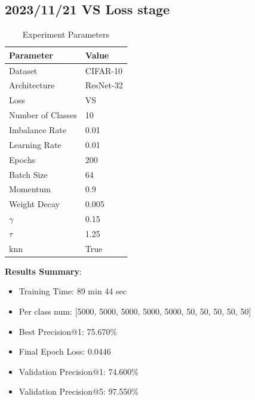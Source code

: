 \documentclass{article}
\begin{document}
\begin{multicols}{2} %
\section{2023/11/21 VS Loss stage}
\begin{table}[H]
\centering
\caption{Experiment Parameters}
\label{tab:parameters}
\begin{tabular}{ll}
\toprule
Parameter & Value \\
\midrule
Dataset & CIFAR-10 \\
Architecture & ResNet-32 \\
Loss & VS \\
Number of Classes & 10 \\
Imbalance Rate & 0.01 \\
Learning Rate & 0.01 \\
Epochs & 200 \\
Batch Size & 64 \\
Momentum & 0.9 \\
Weight Decay & 0.005 \\
\(\gamma\) & 0.15 \\
\(\tau\) & 1.25 \\
knn & True \\
\bottomrule
\end{tabular}
\end{table}

\textbf{Results Summary}:
\begin{itemize}
    \item Training Time: 89 min 44 sec
    \item Per class num: [5000, 5000, 5000, 5000, 5000, 50, 50, 50, 50, 50]
    \item Best Precision@1: 75.670\%  
    \item Final Epoch Loss: 0.0446
    \item Validation Precision@1: 74.600\%
    \item Validation Precision@5: 97.550\%
\end{itemize}


\end{multicols}
\end{document}
